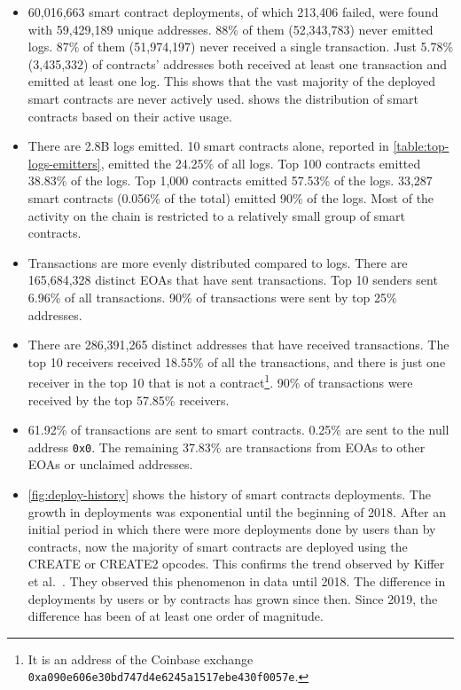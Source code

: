 \begin{itemize}
    \item 60,016,663 smart contract deployments, of which 213,406 failed, were found with 59,429,189 unique addresses. 88\% of them (52,343,783) never emitted logs. 87\% of them (51,974,197) never received a single transaction. Just 5.78\% (3,435,332) of contracts' addresses both received at least one transaction and emitted at least one log. This shows that the vast majority of the deployed smart contracts are never actively used.  shows the distribution of smart contracts based on their active usage.
    
    \item There are 2.8B logs emitted. 10 smart contracts alone, reported in \cref{table:top-logs-emitters}, emitted the 24.25\% of all logs. Top 100 contracts emitted 38.83\% of the logs. Top 1,000 contracts emitted 57.53\% of the logs. 33,287 smart contracts (0.056\% of the total) emitted 90\% of the logs. Most of the activity on the chain is restricted to a relatively small group of smart contracts.
    
    \item Transactions are more evenly distributed compared to logs. There are 165,684,328 distinct EOAs that have sent transactions. Top 10 senders sent 6.96\% of all transactions. 90\% of transactions were sent by top 25\% addresses. 
    
    \item There are 286,391,265 distinct addresses that have received transactions. The top 10 receivers received 18.55\% of all the transactions, and there is just one receiver in the top 10 that is not a contract\footnote{It is an address of the Coinbase exchange {\tt 0xa090e606e30bd747d4e6245a1517ebe430f0057e}.}. 90\% of transactions were received by the top 57.85\% receivers.
    
    \item 61.92\% of transactions are sent to smart contracts. 0.25\% are sent to the null address {\tt 0x0}. The remaining 37.83\% are transactions from EOAs to other EOAs or unclaimed addresses.
    
    \item \cref{fig:deploy-history} shows the history of smart contracts deployments. The growth in deployments was exponential until the beginning of 2018. After an initial period in which there were more deployments done by users than by contracts, now the majority of smart contracts are deployed using the CREATE or CREATE2 opcodes. This confirms the trend observed by Kiffer et al.~\cite{ethereum-sc-topology}. They observed this phenomenon in data until 2018. The difference in deployments by users or by contracts has grown since then. Since 2019, the difference has been of at least one order of magnitude.
\end{itemize}

